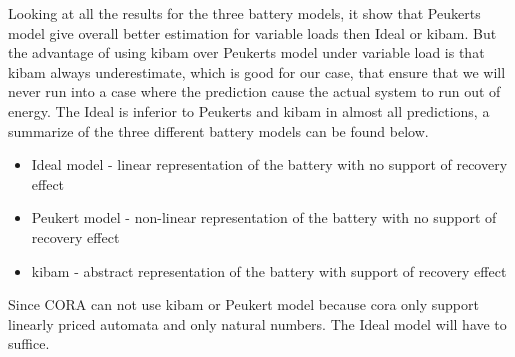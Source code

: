 Looking at all the results for the three battery models, it show that Peukerts model give overall better estimation for variable loads then Ideal or \gls{kibam}. But the advantage of using \gls{kibam} over Peukerts model under variable load is that \gls{kibam} always underestimate, which is good for our case, that ensure that we will never run into a case where the prediction cause the actual system to run out of energy. The Ideal is inferior to Peukerts and \gls{kibam} in almost all predictions, a summarize of the three different battery models can be found below.
\begin{itemize}
	\item Ideal model - linear representation of the battery with no support of recovery effect
	\item Peukert model - non-linear representation of the battery with no support of recovery effect
	\item \gls{kibam} - abstract representation of the battery with support of recovery effect
\end{itemize}
Since CORA can not use \gls{kibam} or Peukert model because \gls{cora} only support linearly priced automata and only natural numbers. The Ideal model will have to suffice.
